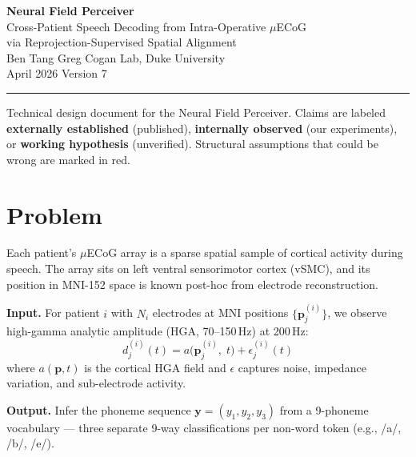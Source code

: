 \documentclass[11pt,letterpaper]{article}
\newcommand{\bfp}{\mathbf{p}}
\newcommand{\bfy}{\mathbf{y}}
\begin{document}
\begin{center}
{\LARGE\bfseries Neural Field Perceiver}\\[6pt]
{\large Cross-Patient Speech Decoding from Intra-Operative $\mu$ECoG\\via Reprojection-Supervised Spatial Alignment}\\[12pt]
{\normalsize Ben Tang \quad\textbar\quad Greg Cogan Lab, Duke University}\\[4pt]
{\normalsize April 2026 \quad\textbar\quad Version 7}
\end{center}

\medskip\noindent\rule{\textwidth}{0.4pt}\medskip

\noindent Technical design document for the Neural Field Perceiver.
Claims are labeled \textbf{externally established} (published), \textbf{internally observed} (our experiments), or \textbf{working hypothesis} (unverified).
Structural assumptions that could be wrong are marked in \textcolor{BrickRed}{red}.

\tableofcontents
\newpage



\section{Problem}\label{sec:problem}

Each patient's $\mu$ECoG array is a sparse spatial sample of cortical activity during speech. The array sits on left ventral sensorimotor cortex (vSMC), and its position in MNI-152 space is known post-hoc from electrode reconstruction.

\textbf{Input.} For patient $i$ with $N_i$ electrodes at MNI positions $\{\bfp_j^{(i)}\}$, we observe high-gamma analytic amplitude (HGA, 70--150\,Hz) at 200\,Hz:
\begin{equation}\label{eq:observation}
d_j^{(i)}(t) = a\bigl(\bfp_j^{(i)},\; t\bigr) + \epsilon_j^{(i)}(t)
\end{equation}
where $a(\bfp, t)$ is the cortical HGA field and $\epsilon$ captures noise, impedance variation, and sub-electrode activity.

\textbf{Output.} Infer the phoneme sequence $\bfy = (y_1, y_2, y_3)$ from a 9-phoneme vocabulary --- three separate 9-way classifications per non-word token (e.g., /a/, /b/, /e/).
\end{document}
